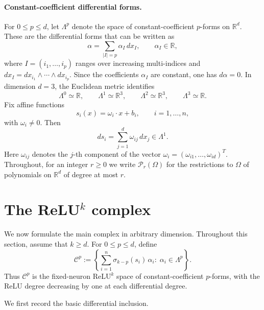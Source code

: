 \documentclass[pdflatex,sn-mathphys-num]{sn-jnl}
\numberwithin{equation}{section}
\numberwithin{theorem}{section}
\numberwithin{table}{section}
\numberwithin{figure}{section}
\begin{document}
\paragraph{Constant-coefficient differential forms.}
For $0\le p\le d$, let $\Lambda^p$ denote the space of constant-coefficient $p$-forms on $\mathbb  R  ^d$.
These are the differential forms that can be written as
\begin{equation}
\alpha=\sum_{|I|=p} \alpha_I\,dx_I,
\qquad \alpha_I\in\mathbb  R  ,
\end{equation}
where $I=(i_1,\ldots,i_p)$ ranges over increasing multi-indices and $dx_I=dx_{i_1}\wedge\cdots\wedge dx_{i_p}$. Since the coefficients $\alpha_I$ are constant, one has $d\alpha=0$. In dimension $d=3$, the Euclidean metric identifies
\begin{equation}
\Lambda^0\simeq \mathbb  R  ,
\qquad
\Lambda^1\simeq \mathbb  R  ^3,
\qquad
\Lambda^2\simeq \mathbb  R  ^3,
\qquad
\Lambda^3\simeq \mathbb  R  .
\end{equation}
Fix affine functions
\begin{equation}
s_i(x)=\omega_i\cdot x+b_i,
\qquad i=1,\dots,n,
\end{equation}
with $\omega_i\neq 0$. Then
\begin{equation}
ds_i=\sum_{j=1}^d \omega_{ij}\,dx_j\in\Lambda^1.
\end{equation}
Here $\omega_{ij}$ denotes the $j$-th component of the vector $\omega_i=(\omega_{i1},\ldots,\omega_{id})^T$. Throughout, for an integer $r\ge 0$ we write $\mathcal P _r(\Omega)$ for the restrictions to $\Omega$ of polynomials on $\mathbb  R  ^d$ of degree at most $r$.

\section{The ReLU$^k$ complex}\label{sec:relu-complex}

We now formulate the main complex in arbitrary dimension. Throughout this
section, assume that $k\ge d$. For $0\le p\le d$, define
\begin{equation}
\mathcal C^p
:=
\left\{
\sum_{i=1}^n \sigma_{k-p}(s_i)\,\alpha_i
:\;
\alpha_i\in\Lambda^p
\right\}.
\end{equation}
Thus $\mathcal C^p$ is the fixed-neuron ReLU$^k$ space of
constant-coefficient $p$-forms, with the ReLU degree decreasing by one at
each differential degree.

We first record the basic differential inclusion.
\end{document}
